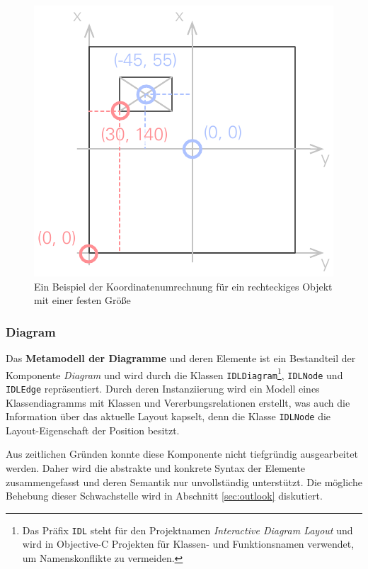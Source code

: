 \begin{figure}[hbt]
    \centering
    \includegraphics{resources/coordinates-conversion}
    \caption{Ein Beispiel der Koordinatenumrechnung für ein rechteckiges Objekt mit einer festen Größe}
    \label{fig:coordinates-conversion}
\end{figure}

\subsubsection{Diagram}
\label{subsubsec:component-diagram}

Das \textbf{Metamodell der Diagramme} und deren Elemente ist ein Bestandteil der Komponente \textit{Diagram} und wird durch die Klassen \texttt{IDLDiagram}\footnote{Das Präfix \texttt{IDL} steht für den Projektnamen \textit{Interactive Diagram Layout} und wird in Objective-C Projekten für Klassen- und Funktionsnamen verwendet, um Namenskonflikte zu vermeiden.}, \texttt{IDLNode} und \texttt{IDLEdge} repräsentiert. Durch deren Instanziierung wird ein Modell eines Klassendiagramms mit Klassen und Vererbungsrelationen erstellt, was auch die Information über das aktuelle Layout kapselt, denn die Klasse \texttt{IDLNode} die Layout-Eigenschaft der Position besitzt.

Aus zeitlichen Gründen konnte diese Komponente nicht tiefgründig ausgearbeitet werden. Daher wird die abstrakte und konkrete Syntax der Elemente zusammengefasst und deren Semantik nur unvollständig unterstützt. Die mögliche Behebung dieser Schwachstelle wird in Abschnitt \ref{sec:outlook} diskutiert.


